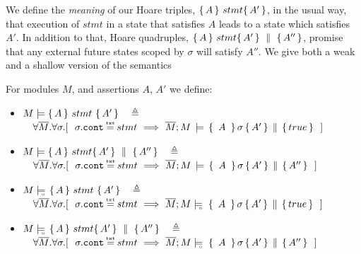 {\label{sect:HLmeans}

We  define the {\emph {meaning}} of  our Hoare triples, $ \{\, A \, \}\ stmt \{\, A' \, \}$,  in the usual way, \ie that execution of $stmt$ in a state that satisfies $A$ leads to a state which satisfies $A'$.  
In addition to that, Hoare quadruples, $ \{\, A \, \}\ stmt \{\, A' \, \} \, \,\parallel\,\, \{\, A'' \, \} $, promise that any external future states scoped by $\sigma$ will satisfy $A''$.
We give both a weak and a shallow version of the semantics


 \begin{definition}
For modules $M$, and assertions $A$, $A'$   we define:
\begin{itemize}
\item
\label{def:hoare:sem:one}
$M \models   \{\, A \,  \}\ stmt\  \{\, A' \, \}\ \ \ \triangleq$\\
{$\strut  \ \ \ \forall    \Mtwo. \forall  \sigma.[ \ \   %
 \sigma.\prg{cont}\txteq stmt\   \Longrightarrow \ 
{\satAssertQuadruple  \Mtwo  M   {\  A\ }  \sigma  { A'  } {true} } \ \ ]$%
}
 \item
 \label{def:hoare:sem:two}
$M \models  \{\, A \, \}\ stmt \{\, A' \, \} \, \,\parallel\,\, \{\, A'' \, \}   \ \ \  \triangleq$ \\
{$\strut  \ \ \  \forall    \Mtwo. \forall  \sigma.[ \  \  \sigma.\prg{cont}\txteq stmt\   \Longrightarrow \ 
{\satAssertQuadruple  \Mtwo  M    {\  A\ }  \sigma  { A'  } {A''} } \ \ ]$%
}
\item
\label{def:hoare:sem:three}
$M \models\!\!\!\!_{_{\circ}}\    \{\, A \,  \}\ stmt\  \{\, A' \, \}  \ \ \ \triangleq$\\
{$\strut  \ \ \ \forall    \Mtwo. \forall  \sigma.[ \ \   %
 \sigma.\prg{cont}\txteq stmt\   \Longrightarrow \ 
{\satDAssertQuadrupleFrom \Mtwo  M  \sigma   {\  A\ } { A'  } {true} } \ \ ]$%
}
 
 \item
 \label{def:hoare:sem:four}
$M \models\!\!\!\!_{_{\circ}}\   \{\, A \, \}\ stmt \{\, A' \, \} \, \,\parallel\,\, \{\, A'' \, \}    \ \ \  \triangleq$ \\
{$\strut  \ \ \  \forall    \Mtwo. \forall  \sigma.[ \ \    \sigma.\prg{cont}\txteq stmt\   \Longrightarrow \ 
{\satDAssertQuadrupleFrom \Mtwo  M  \sigma   {\  A\ } { A'  } {A''} } \ \ ]$%
}

\end{itemize}
\end{definition}



}
